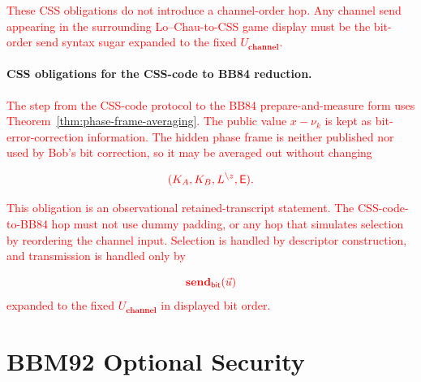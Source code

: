 \documentclass[acmsmall,screen,review,anonymous,nonacm]{acmart}
\theoremstyle{defn_style}
\begin{document}
\textcolor{red}{These CSS obligations do not introduce a channel-order hop. Any channel
send appearing in the surrounding Lo--Chau-to-CSS game display must be the
bit-order send syntax sugar expanded to the fixed \(U_{\textbf{channel}}\).}

\paragraph{CSS obligations for the CSS-code to BB84 reduction.}

\textcolor{red}{The step from the CSS-code protocol to the BB84 prepare-and-measure form
uses Theorem~\ref{thm:phase-frame-averaging}. The public value
\(x-\nu_k\) is kept as bit-error-correction information. The hidden phase
frame is neither published nor used by Bob's bit correction, so it may be
averaged out without changing}

\[
\textcolor{red}{
(K_A,K_B,L^{\setminus z},\mathsf E).
}
\]

\textcolor{red}{This obligation is an observational retained-transcript statement. The CSS-code-to-BB84 hop must not use dummy padding, or any
hop that simulates selection by reordering the channel input. Selection is
handled by descriptor construction, and transmission is handled only by}

\[
\textcolor{red}{
\mathbf{send}_{\mathsf{bit}}(\vec u)
}
\]
\textcolor{red}{expanded to the fixed \(U_{\textbf{channel}}\) in displayed bit order.}


\section{BBM92 Optional Security}
\end{document}
